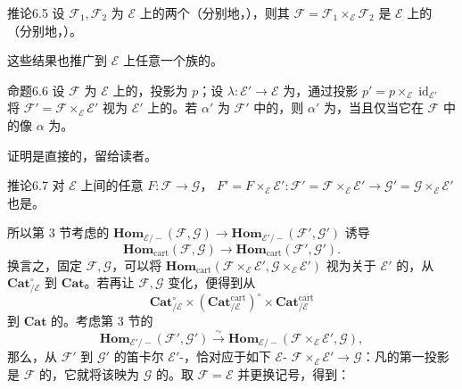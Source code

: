 \begin{SGAresult}{推论}{6.5}
设 $\mathcal F_1,\mathcal F_2$ 为 $\mathcal E$ 上的两个（分别地，），则其 $\mathcal F=\mathcal F_1\times_{\mathcal E}\mathcal F_2$ 是 $\mathcal E$ 上的（分别地，）。
\end{SGAresult}

这些结果也推广到 $\mathcal E$ 上任意一个族的。

\begin{SGAresult}{命题}{6.6}
设 $\mathcal F$ 为 $\mathcal E$ 上的，投影为 $p$；设 $\lambda:\mathcal E'\to\mathcal E$ 为，通过投影 $p'=p\times_{\mathcal E}\operatorname{id}_{\mathcal E'}$ 将 $\mathcal F'=\mathcal F\times_{\mathcal E}\mathcal E'$ 视为 $\mathcal E'$ 上的。若 $\alpha'$ 为 $\mathcal F'$ 中的，则 $\alpha'$ 为，当且仅当它在 $\mathcal F$ 中的像 $\alpha$ 为。
\end{SGAresult}
证明是直接的，留给读者。

\begin{SGAresult}{推论}{6.7}
对 $\mathcal E$ 上间的任意 $F:\mathcal F\to\mathcal G$， $F'=F\times_{\mathcal E}\mathcal E':\mathcal F'=\mathcal F\times_{\mathcal E}\mathcal E'\to\mathcal G'=\mathcal G\times_{\mathcal E}\mathcal E'$ 也是。
\end{SGAresult}
所以第 3 节考虑的 $\mathbf{Hom}_{\mathcal E/-}(\mathcal F,\mathcal G)\to\mathbf{Hom}_{\mathcal E'/-}(\mathcal F',\mathcal G')$ 诱导
\[
 \mathbf{Hom}_{\mathrm{cart}}(\mathcal F,\mathcal G)\longrightarrow
 \mathbf{Hom}_{\mathrm{cart}}(\mathcal F',\mathcal G').
\]
换言之，固定 $\mathcal F,\mathcal G$，可以将 $\mathbf{Hom}_{\mathrm{cart}}(\mathcal F\times_{\mathcal E}\mathcal E',\mathcal G\times_{\mathcal E}\mathcal E')$ 视为关于 $\mathcal E'$ 的，从 $\mathbf{Cat}_{/\mathcal E}^{\circ}$ 到 $\mathbf{Cat}$。若再让 $\mathcal F,\mathcal G$ 变化，便得到从
\[
 \mathbf{Cat}_{/\mathcal E}^{\circ}\times(\mathbf{Cat}^{\mathrm{cart}}_{/\mathcal E})^\circ
 \times\mathbf{Cat}^{\mathrm{cart}}_{/\mathcal E}
\]
到 $\mathbf{Cat}$ 的。考虑第 3 节的
\[
 \mathbf{Hom}_{\mathcal E'/-}(\mathcal F',\mathcal G')\xrightarrow{\sim}
 \mathbf{Hom}_{\mathcal E/-}(\mathcal F\times_{\mathcal E}\mathcal E',\mathcal G),
\]
那么，从 $\mathcal F'$ 到 $\mathcal G'$ 的笛卡尔 $\mathcal E'$-，恰对应于如下 $\mathcal E$- $\mathcal F\times_{\mathcal E}\mathcal E'\to\mathcal G$：凡的第一投影是 $\mathcal F$ 的，它就将该映为 $\mathcal G$ 的。取 $\mathcal F=\mathcal E$ 并更换记号，得到：

